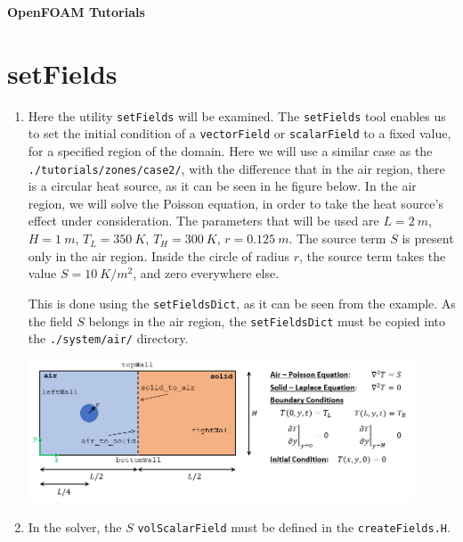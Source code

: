 \documentclass{article}
\begin{document}
\noindent
\begin{huge}
\hspace{-3.0mm}\textbf{OpenFOAM Tutorials}
\end{huge}

\setcounter{section}{3}
\section{setFields}
	
\begin{enumerate}[4.1]
	\item Here the utility {\tt setFields} will be examined. The {\tt setFields} tool enables us to set the initial condition of a {\tt vectorField} or {\tt scalarField} to a fixed value, for a specified region of the domain. Here we will use a similar case as the {\tt ./tutorials/zones/case2/}, with the difference that in the air region, there is a circular heat source, as it can be seen in he figure below. In the air region, we will solve the Poisson equation, in order to take the heat source's effect under consideration. The parameters that will be used are $L=2~m$, $H=1~m$, $T_L=350~K$, $T_H=300~K$, $r=0.125~m$. The source term $S$ is present only in the air region. Inside the circle of radius $r$, the source term takes the value $S=10~K/m^2$, and zero everywhere else. 
	
	This is done using the {\tt setFieldsDict}, as it can be seen from the example. As the field $S$ belongs in the air region, the {\tt setFieldsDict} must be copied into the {\tt ./system/air/} directory.
	
	
	\begin{center}
		\includegraphics[width=0.9\textwidth]{source.png}
	\end{center}


	\item In the solver, the $S$ {\tt volScalarField} must be defined in the {\tt createFields.H}. 
	

\end{enumerate}
\end{document}
